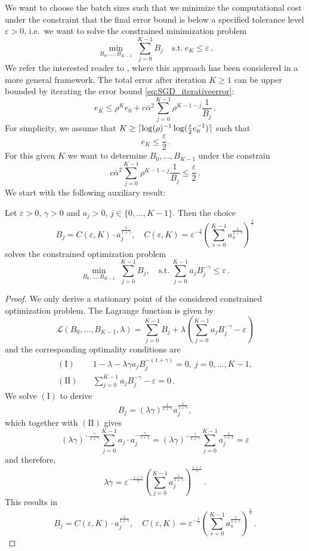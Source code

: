 \documentclass[12pt,openany]{book}
\theoremstyle{definition}
\theoremstyle{definition}
\newcommand{\cL}{\mathcal{L}}
\DeclarePairedDelimiter\ceil{\lceil}{\rceil}
\begin{document}
We want to choose the batch sizes such that we minimize the computational cost under the constraint that the final error bound is below a specified tolerance level $\varepsilon>0$, i.e.~we want to solve the constrained minimization problem
\[\min_{B_0,\dots,B_{K-1}}\ \sum_{j=0}^{K-1} B_j\quad \text{s.t.}\ e_K\le \varepsilon\,. \]
We refer the interested reader to \cite{pmlr-v178-weissmann22a}, where this approach has been considered in a more general framework. The total error after iteration $K\ge1$ can be upper bounded by iterating the error bound \eqref{eq:SGD_iterativeerror}:
\[e_K \le \rho^K e_0 + c\bar\alpha^2 \sum_{j=0}^{K-1} \rho^{K-1-j} \frac{1}{B_j}\,.\]
For simplicity, we assume that $K\ge\ceil{\log(\rho)^{-1}\log(\frac{\varepsilon}2e_0^{-1})}$ such that
\[e_K\le \frac{\varepsilon}{2}.\]
For this given $K$ we want to determine $B_0,\dots,B_{K-1}$ under the constrain
\[ c\bar\alpha^2 \sum_{j=0}^{K-1} \rho^{K-1-j} \frac{1}{B_j}\le \frac{\varepsilon}2\,.\]
We start with the following auxiliary result:
\begin{lemma}\label{lem:optimalbatch}
Let $\varepsilon>0$, $\gamma>0$ and $a_j>0$, $j\in\{0,\dots,K-1\}$. Then the choice
\[B_j = C(\varepsilon,K)\cdot a_j^{\frac{1}{1+\gamma}},\quad C(\varepsilon,K) = \varepsilon^{-\frac1\gamma}\left(\sum_{s=0}^{K-1} a_s^{\frac1{1+\gamma}}\right)^{\frac1\gamma} \]
solves the constrained optimization problem
\[\min_{B_0,\dots,B_{K-1}}\ \sum_{j=0}^{K-1} B_j,\quad \text{s.t.}\ \sum_{j=0}^{K-1} a_j B_j^{-\gamma}\le \varepsilon\, . \]
\end{lemma}
\begin{proof}
We only derive a stationary point of the considered constrained optimization problem. 
The Lagrange function is given by
\[\cL(B_0,\dots,B_{K-1},\lambda) = \sum_{j=0}^{K-1} B_j + \lambda\left(\sum_{j=0}^{K-1} a_j B_j^{-\gamma} - \varepsilon\right) \]
and the corresponding optimality conditions are
\begin{align*}
({\mathrm I})& \quad 1-\lambda -\lambda\gamma a_j B_j^{-(1+\gamma)} = 0,\ j=0,\dots,K-1,\\
({\mathrm{II}})& \quad \sum_{j=0}^{K-1} a_j B_j^{-\gamma} -\varepsilon =0\,.
\end{align*}
We solve $({\mathrm{I}})$ to derive
\[B_j = (\lambda \gamma)^{\frac{1}{1+\gamma}} a_j^{\frac{1}{1+\gamma}}, \]
which together with $({\mathrm{II}})$ gives
\[(\lambda\gamma)^{-\frac{\gamma}{1+\gamma}} \sum_{j=0}^{K-1} a_j\cdot a_j^{-\frac{\gamma}{\gamma+1}} = (\lambda\gamma)^{-\frac{\gamma}{1+\gamma}} \sum_{j=0}^{K-1}  a_j^{\frac{1}{\gamma+1}} = \varepsilon\]
and therefore, 
\[\lambda\gamma = \varepsilon^{-\frac{1+\gamma}{\gamma}} \left( \sum_{j=0}^{K-1} a_j^{\frac{1}{1+\gamma}}\right)^{\frac{1+\gamma}{\gamma}}\,. \]
This results in 
\[B_j = C(\varepsilon,K)\cdot a_j^{\frac{1}{1+\gamma}},\quad C(\varepsilon,K) = \varepsilon^{-\frac1\gamma}\left(\sum_{s=0}^{K-1} a_s^{\frac1{1+\gamma}}\right)^{\frac1\gamma}\,. \]
\end{proof}
\end{document}
